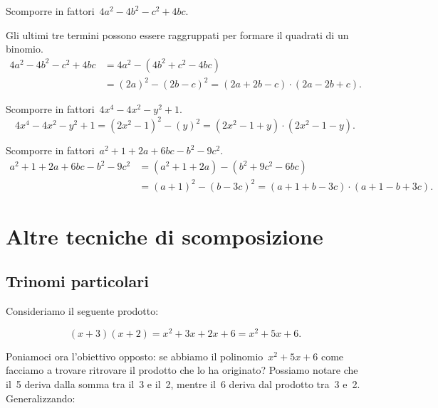 \begin{exrig}
 \begin{esempio}
Scomporre in fattori~$4a^{2}-4b^{2}-c^{2}+4bc$.

Gli ultimi tre termini possono essere raggruppati per formare il quadrati di un binomio.
 \begin{equation*}
   \begin{split}
     4a^{2}-4b^{2}-c^{2}+4bc &=4a^{2}-\left(4b^{2}+c^{2}-4bc\right) \\
                 &= (2a)^{2}-(2b-c)^{2}=(2a+2b-c)\cdot (2a-2b+c).
   \end{split}
  \end{equation*}
 \end{esempio}

 \begin{esempio}
Scomporre in fattori~$4x^{4}-4x^{2}-y^{2}+1$.
\[4x^{4}-4x^{2}-y^{2}+1=\left(2x^{2}-1\right)^{2}-(y)^{2}=(2x^{2}-1+y)\cdot (2x^{2}-1-y).\]
 \end{esempio}

 \begin{esempio}
Scomporre in fattori~$a^{2}+1+2a+6bc-b^{2}-9c^{2}$.
 \begin{equation*}
   \begin{split}
     a^{2}+1+2a+6bc-b^{2}-9c^{2} &=\left(a^{2}+1+2a\right)-\left(b^{2}+9c^{2}-6{bc}\right) \\
                 &= (a+1)^{2}-(b-3c)^{2}=(a+1+b-3c)\cdot (a+1-b+3c).
   \end{split}
  \end{equation*}
 \end{esempio}
\end{exrig}
\ovalbox{\risolvii  \ref{ese:13.60}, \ref{ese:13.61}, \ref{ese:13.62}, \ref{ese:13.63}, \ref{ese:13.64}, \ref{ese:13.65}, \ref{ese:13.66}, \ref{ese:13.67}, \ref{ese:13.68}, \ref{ese:13.69}}

\section{Altre tecniche di scomposizione}

\subsection{Trinomi particolari}

Consideriamo il seguente prodotto:

\[(x+3)(x+2)=x^{2}+3x+2x+6=x^{2}+5x+6.\]

Poniamoci ora l'obiettivo opposto: se abbiamo il
polinomio~$x^{2}+5x+6$ come facciamo a trovare ritrovare il prodotto
che lo ha originato? Possiamo notare che il~5 deriva dalla somma tra
il~3 e il~2, mentre il~6 deriva dal prodotto tra~3 e~2. Generalizzando:


